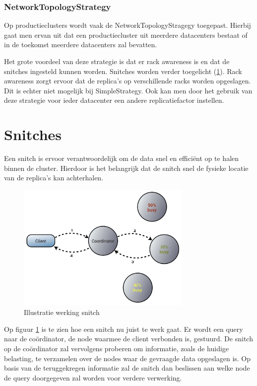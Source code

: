 	
\subsubsection{NetworkTopologyStrategy}
Op productieclusters wordt vaak de NetworkTopologyStragegy toegepast.
Hierbij gaat men ervan uit dat een productiecluster uit meerdere datacenters bestaat of in de toekomst meerdere datacenters zal bevatten.

Het grote voordeel van deze strategie is dat er rack awareness is en dat de snitches ingesteld kunnen worden.
Snitches worden verder toegelicht (\ref{sec_snitch}).
Rack awareness zorgt ervoor dat de replica's op verschillende racks worden opgeslagen.
Dit is echter niet mogelijk bij SimpleStrategy.
Ook kan men door het gebruik van deze strategie voor ieder datacenter een andere replicatiefactor instellen.

\section{Snitches}
\label{sec_snitch}
Een snitch is ervoor verantwoordelijk om de data snel en efficiënt op te halen binnen de cluster.
Hierdoor is het belangrijk dat de snitch snel de fysieke locatie van de replica's kan achterhalen.

\begin{figure}[H]
	\centering
	\includegraphics[width=0.75\textwidth]{img/4_architectuur/snitch}
	\caption{Illustratie werking snitch \citep{Planet2013Snitch}}
	\label{fig:snitch}
\end{figure}

Op figuur \ref{fig:snitch} is te zien hoe een snitch nu juist te werk gaat.
Er wordt een query naar de coördinator, de node waarmee de client verbonden is, gestuurd.
De snitch op de coördinator zal vervolgens proberen om informatie, zoals de huidige belasting, te verzamelen over de nodes waar de gevraagde data opgeslagen is.
Op basis van de teruggekregen informatie zal de snitch dan beslissen aan welke node de query doorgegeven zal worden voor verdere verwerking.

